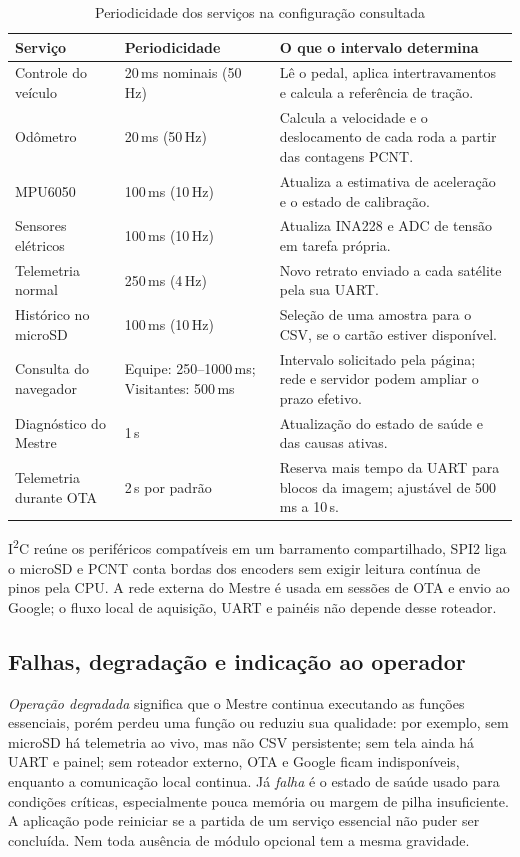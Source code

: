 \begin{table}[htbp]\centering\small
\caption{Periodicidade dos serviços na configuração consultada}\label{tab:ritmos}
\begin{tabularx}{\textwidth}{@{}p{3.3cm}p{3.2cm}X@{}}\toprule
Serviço & Periodicidade & O que o intervalo determina\\\midrule
Controle do veículo & 20\,ms nominais (50\,Hz) & Lê o pedal, aplica intertravamentos e calcula a referência de tração.\\
Odômetro & 20\,ms (50\,Hz) & Calcula a velocidade e o deslocamento de cada roda a partir das contagens PCNT.\\
MPU6050 & 100\,ms (10\,Hz) & Atualiza a estimativa de aceleração e o estado de calibração.\\
Sensores elétricos & 100\,ms (10\,Hz) & Atualiza INA228 e ADC de tensão em tarefa própria.\\
Telemetria normal & 250\,ms (4\,Hz) & Novo retrato enviado a cada satélite pela sua UART.\\
Histórico no microSD & 100\,ms (10\,Hz) & Seleção de uma amostra para o CSV, se o cartão estiver disponível.\\
Consulta do navegador & Equipe: 250--1000\,ms; Visitantes: 500\,ms & Intervalo solicitado pela página; rede e servidor podem ampliar o prazo efetivo.\\
Diagnóstico do Mestre & 1\,s & Atualização do estado de saúde e das causas ativas.\\
Telemetria durante OTA & 2\,s por padrão & Reserva mais tempo da UART para blocos da imagem; ajustável de 500\,ms a 10\,s.\\\bottomrule
\end{tabularx}\end{table}

I\textsuperscript{2}C reúne os periféricos compatíveis em um barramento compartilhado, SPI2 liga o microSD e PCNT conta bordas dos encoders sem exigir leitura contínua de pinos pela CPU. A rede externa do Mestre é usada em sessões de OTA e envio ao Google; o fluxo local de aquisição, UART e painéis não depende desse roteador.

\subsection{Falhas, degradação e indicação ao operador}
\emph{Operação degradada} significa que o Mestre continua executando as funções essenciais, porém perdeu uma função ou reduziu sua qualidade: por exemplo, sem microSD há telemetria ao vivo, mas não CSV persistente; sem tela ainda há UART e painel; sem roteador externo, OTA e Google ficam indisponíveis, enquanto a comunicação local continua. Já \emph{falha} é o estado de saúde usado para condições críticas, especialmente pouca memória ou margem de pilha insuficiente. A aplicação pode reiniciar se a partida de um serviço essencial não puder ser concluída. Nem toda ausência de módulo opcional tem a mesma gravidade.

